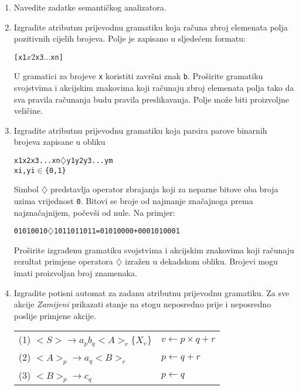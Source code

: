 \documentclass[times, 12pt, utf8]{book}
\begin{document}
\begin{enumerate}[resume]
\item
Navedite zadatke semantičkog analizatora. \cite[str.~160]{udzbenik}

\item
Izgradite atributnu prijevodnu gramatiku koja računa zbroj elemenata polja pozitivnih cijelih brojeva.
Polje je zapisano u sljedećem formatu:

\begin{alltt}
[x1 $ x2 $ x3 $ ... $ xn]
\end{alltt}

U gramatici za brojeve \texttt{x} koristiti završni znak \texttt{b}.
Proširite gramatiku svojstvima i akcijskim znakovima koji računaju zbroj elemenata polja tako da sva pravila računanja budu pravila preslikavanja.
Polje može biti proizvoljne veličine.  \cite[str.~177-180]{udzbenik} \cite{auditorne}

\item
Izgradite atributnu prijevodnu gramatiku koja parsira parove binarnih brojeva zapisane u obliku

\begin{alltt}
x1 x2 x3 ... xn \(\diamondsuit\) y1 y2 y3 ... ym
xi, yi \(\in\) \verb|{|0, 1\verb|}|
\end{alltt}

Simbol \(\diamondsuit\) predstavlja operator zbrajanja koji za neparne bitove oba broja uzima vrijednost \texttt{0}.
Bitovi se broje od najmanje značajnoga prema najznačajnijem, počevši od nule.
Na primjer:
\begin{alltt}
01010010 \(\diamondsuit\) 1011011011 = 01010000 + 0001010001
\end{alltt}
Proširite izgrađenu gramatiku svojstvima i akcijskim znakovima koji računaju rezultat primjene operatora \(\diamondsuit\) izražen u dekadskom obliku.
Brojevi mogu imati proizvoljan broj znamenaka. \cite[str.~177-180]{udzbenik} \cite{auditorne}

\item
Izgradite potisni automat za zadanu atributnu prijevodnu gramatiku.
Za sve akcije \emph{Zamijeni} prikazati stanje na stogu neposredno prije i neposredno poslije primjene akcije. \cite[str.~184-195]{udzbenik} \cite{auditorne}

\begin{tabular}{ll}
(1) \( <S> \to a_{p} b_{q} <A>_{r} \{X_{v}\} \) &   \( v \leftarrow p \times q+r \) \\
(2) \( <A>_{p} \to a_{q} <B>_{r} \) & \( p \leftarrow q+r \) \\
(3) \( <B>_{p} \to c_{q} \) & \( p \leftarrow q \)  \\
\end{tabular} 

\end{enumerate}
\end{document}
